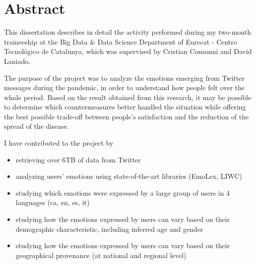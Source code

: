 
\chapter*{Abstract} %
\label{abstract}


This dissertation describes in detail the activity performed during my two-month traineeship at the Big Data \& Data Science Department of Eurecat - Centro Tecnológico de Catalunya, which was supervised by Cristian Consonni and David Laniado.

The purpose of the project was to analyze the emotions emerging from Twitter messages during the pandemic, in order to understand how people felt over the whole period. Based on the result obtained from this research, it may be possible to determine which countermeasures better handled the situation while offering the best possible trade-off between people's satisfaction and the reduction of the spread of the disease.

I have contributed to the project by
    
\begin{itemize}
    	\item retrieving over 6TB of data from Twitter
    	\item analyzing users' emotions using state-of-the-art libraries (EmoLex, LIWC)
    	\item studying which emotions were expressed by a large group of users in 4 languages (ca, en, es, it)
    	\item studying how the emotions expressed by users can vary based on their demographic characteristic, including inferred age and gender
    	\item studying how the emotions expressed by users can vary based on their geographical provenance (at national and regional level)
\end{itemize}

